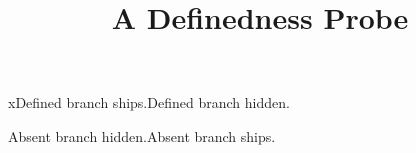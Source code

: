 \documentclass{article}
\title{A Definedness Probe}
\date{}
\newcommand{\probedefined}{x}
\begin{document}
\maketitle
\ifdefined\probedefined Defined branch ships.\else Defined branch hidden.\fi

\ifdefined\probeabsent Absent branch hidden.\else Absent branch ships.\fi
\end{document}
